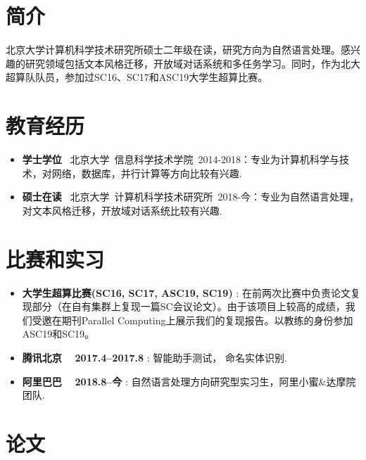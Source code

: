 \documentclass[letterpaper]{article}
\begin{document}
\section*{简介}
北京大学计算机科学技术研究所硕士二年级在读，研究方向为自然语言处理。感兴趣的研究领域包括文本风格迁移，开放域对话系统和多任务学习。同时，作为北大超算队队员，参加过SC16、SC17和ASC19大学生超算比赛。


\section*{教育经历}
\begin{itemize}
  \item \textbf{学士学位} ~北京大学~信息科学技术学院~2014-2018：专业为计算机科学与技术，对网络，数据库，并行计算等方向比较有兴趣.
  \item \textbf{硕士在读} ~北京大学~计算机科学技术研究所~2018-今：专业为自然语言处理，对文本风格迁移，开放域对话系统比较有兴趣.
\end{itemize}


\section*{比赛和实习}
\begin{itemize}
  \item \textbf{大学生超算比赛(SC16, SC17, ASC19, SC19)} : 在前两次比赛中负责论文复现部分（在自有集群上复现一篇SC会议论文）。由于该项目上较高的成绩，我们受邀在期刊Parallel Computing上展示我们的复现报告。以教练的身份参加ASC19和SC19。
  \item \textbf{腾讯北京 ~ 2017.4--2017.8} : 智能助手测试， 命名实体识别.
  \item \textbf{阿里巴巴 ~ 2018.8--今} : 自然语言处理方向研究型实习生，阿里小蜜\&达摩院团队.
\end{itemize}


\section*{论文}
\end{document}

